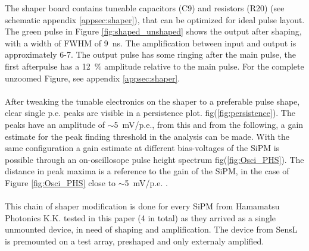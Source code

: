 \documentclass[12pt,article,type=msc,colorback,accentcolor=tud9c]{tudthesis}
\begin{document}
The shaper board contains tuneable capacitors (C9) and resistors (R20) (see schematic appendix {\ref{appsec:shaper}}), that can be optimized for ideal pulse layout. The green pulse in Figure \ref{fig:shaped_unshaped} shows the output after shaping, with a width of FWHM of 9~ns. The amplification between input and output is approximately 6-7. The output pulse has some ringing after the main pulse, the first afterpulse has a 12~$\%$ amplitude relative to the main pulse. For the complete unzoomed Figure, see appendix {\ref{appsec:shaper}}. \\\\
After tweaking the tunable electronics on the shaper to a preferable pulse shape, clear single p.e. peaks are visible in a persistence plot. fig(\ref{fig:persistence}). The peaks have an amplitude of $\sim$5~mV/p.e., from this and from the following, a gain estimate for the peak finding threshold in the analysis can be made. With the same configuration a gain estimate at different bias-voltages of the SiPM is possible through an on-oscillosope pulse height spectrum fig(\ref{fig:Osci_PHS}). The distance in peak maxima is a reference to the gain of the SiPM, in the case of Figure \ref{fig:Osci_PHS} close to $\sim$5~mV/p.e. .\\\\
This chain of shaper modification is done for every SiPM from Hamamatsu Photonics K.K. tested in this paper (4 in total) as they arrived as a single unmounted device, in need of shaping and amplification. The device from SensL is premounted on a test array, preshaped and only externaly amplified.








\clearpage
\end{document}
